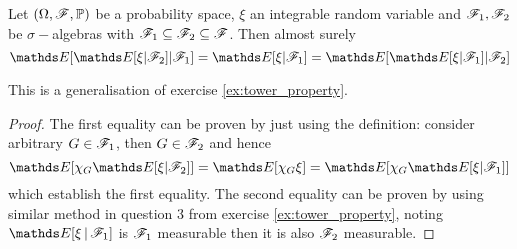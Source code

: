 \begin{property}
Let $(\Omega, \mathcal{F},\mathbb{P})$ be a probability space, $\xi$ an integrable random variable and $\mathcal{F}_1, \mathcal{F}_2$ be $\sigma-$algebras with $\mathcal{F}_1 \subseteq \mathcal{F}_2 \subseteq \mathcal{F}$. Then almost surely
\begin{equation}
\E[\E[\xi | \F_2] | \F_1] = \E[\xi | \F_1] = \E[\E[\xi | \F_1] | \F_2]
\end{equation}
\end{property}

\begin{hint}
This is a generalisation of exercise \ref{ex:tower_property}.
\end{hint}

\begin{proof}
The first equality can be proven by just using the definition: consider arbitrary $G \in \mathcal{F}_1$, then $G \in \mathcal{F}_2$ and hence 
\begin{equation}
    \E[\chi_G \E[\xi | \F_2]] = \E[\chi_G \xi] = \E[\chi_G \E[\xi | \F_1]]
\end{equation}
which establish the first equality. The second equality can be proven by using similar method in  question 3 from exercise \ref{ex:tower_property}, noting $\E[\xi\,|\,\F_1]$ is $\mathcal{F}_1$ measurable then it is also $\mathcal{F}_2$ measurable.
\end{proof}


